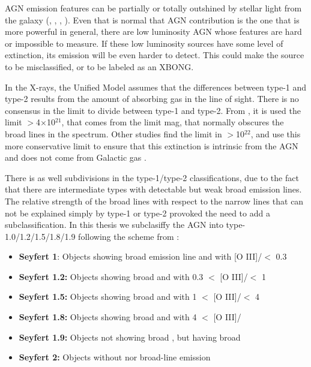 AGN emission features can be partially or totally outshined by stellar light from the galaxy (\citealt{severgnini03}, \citealt{georgantopoulos05}, \citealt{caccianiga07}, \citealt{caccianiga08}). Even that is normal that AGN contribution is the one that is more powerful in general, there are low luminosity AGN whose features are hard or impossible to measure. If these low luminosity sources have some level of extinction, its emission will be even harder to detect. This could make the source to be misclassified, or to be labeled as an XBONG.

In the X-rays, the Unified Model assumes that the differences between type-1 and type-2 results from the amount of absorbing gas in the line of sight. There is no consensus in the limit to divide between type-1 and type-2. From \cite{caccianiga08}, it is used the limit \NH$>$4$\times$10$^{21}$\cm \cm, that comes from the limit  mag, that normally obscures the broad lines in the spectrum. Other studies find the limit in \NH$>$10$^{22}$\cm\citep{ueda03}, and use this more conservative limit to ensure that this extinction is intrinsic from the AGN and does not come from Galactic gas .

There is as well subdivisions in the type-1/type-2 classifications, due to the fact that there are intermediate types with detectable but weak broad emission lines. The relative strength of the broad lines with respect to the narrow lines that can not be explained simply by type-1 or type-2 provoked the need to add a subclassification. In this thesis we subclasiffy the AGN into type-1.0/1.2/1.5/1.8/1.9 following the scheme from \cite{whittle92}:

\begin{itemize}
\item \textbf{Seyfert 1}: Objects showing broad \Hb emission line and with [O III]/\Hb $<$ 0.3
\item \textbf{Seyfert 1.2:} Objects showing broad \Hb and with 0.3 $<$ [O III]/\Hb $<$ 1
\item \textbf{Seyfert 1.5:} Objects showing broad \Hb and with 1 $<$ [O III]/\Hb $<$ 4
\item \textbf{Seyfert 1.8:} Objects showing broad \Hb and with 4 $<$ [O III]/\Hb
\item \textbf{Seyfert 1.9:} Objects not showing broad \Hb, but having broad \Ha
\item \textbf{Seyfert 2:} Objects without \Ha nor \Hb broad-line emission 

\end{itemize}

